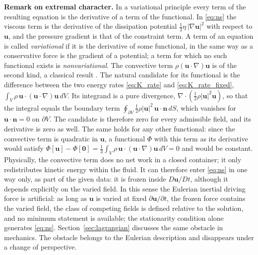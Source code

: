 \documentclass[aip,pof,reprint,amsmath,amssymb,longbibliography]{revtex4-2}
\begin{document}
\textbf{Remark on extremal character.} In a variational principle every term of the resulting equation is the derivative of a term of the functional. In \eqref{eq:ns} the viscous term is the derivative of the dissipation potential $\tfrac{1}{2}\eta\,|\nabla\boldsymbol{u}|^2$ with respect to $\boldsymbol{u}$, and the pressure gradient is that of the constraint term. A term of an equation is called \textit{variational} if it is the derivative of some functional, in the same way as a conservative force is the gradient of a potential; a term for which no such functional exists is \textit{nonvariational}. The convective term $\rho(\boldsymbol{u}\cdot\nabla)\boldsymbol{u}$ is of the second kind, a classical result \cite{finlayson1972}. The natural candidate for its functional is the difference between the two energy rates \eqref{eq:K_rate} and \eqref{eq:K_rate_fixed}, $\int_V \rho\,\boldsymbol{u}\cdot(\boldsymbol{u}\cdot\nabla)\boldsymbol{u}\, dV$. Its integrand is a pure divergence, $\nabla\cdot(\tfrac{1}{2}\rho|\boldsymbol{u}|^2\boldsymbol{u})$, so that the integral equals the boundary term $\oint_{\partial V} \tfrac{1}{2}\rho|\boldsymbol{u}|^2\, \boldsymbol{u}\cdot\boldsymbol{n}\, dS$, which vanishes for $\boldsymbol{u}\cdot\boldsymbol{n} = 0$ on $\partial V$. The candidate is therefore zero for every admissible field, and its derivative is zero as well. The same holds for any other functional: since the convective term is quadratic in $\boldsymbol{u}$, a functional $\Phi$ with this term as its derivative would satisfy $\Phi[\boldsymbol{u}] - \Phi[\boldsymbol{0}] = \tfrac{1}{3}\int_V \rho\,\boldsymbol{u}\cdot(\boldsymbol{u}\cdot\nabla)\boldsymbol{u}\, dV = 0$ and would be constant. Physically, the convective term does no net work in a closed container; it only redistributes kinetic energy within the fluid. It can therefore enter \eqref{eq:ns} in one way only, as part of the given data: it is frozen inside $D\boldsymbol{u}/Dt$, although it depends explicitly on the varied field. In this sense the Eulerian inertial driving force is artificial: as long as $\boldsymbol{u}$ is varied at fixed $\partial\boldsymbol{u}/\partial t$, the frozen force contains the varied field, the class of competing fields is defined relative to the solution, and no minimum statement is available; the stationarity condition alone generates \eqref{eq:ns}. Section~\ref{sec:lagrangian} discusses the same obstacle in mechanics. The obstacle belongs to the Eulerian description and disappears under a change of perspective.
\end{document}
